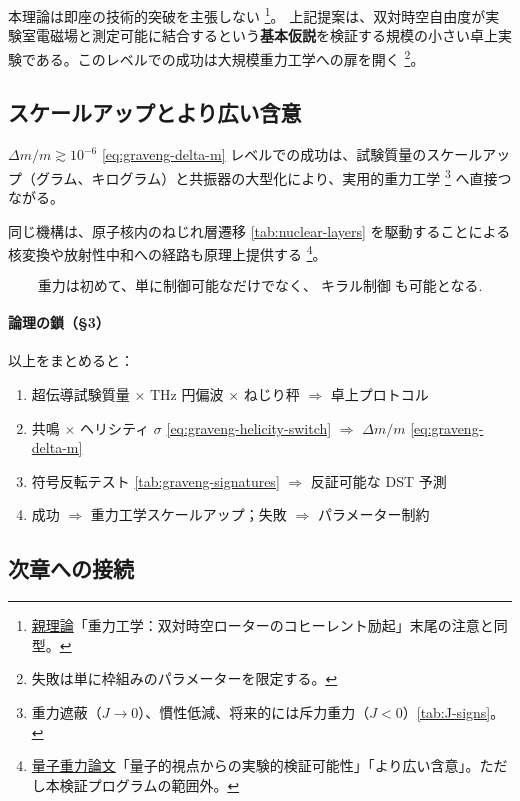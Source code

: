 \documentclass[dvipdfmx,a4paper,oneside]{jsbook}
\numberwithin{equation}{chapter}
\begin{document}
本理論は即座の技術的突破を主張しない \footnote{\hyperref[sec:sister-manuscripts]{親理論}「重力工学：双対時空ローターのコヒーレント励起」末尾の注意と同型。}。
上記提案は、双対時空自由度が実験室電磁場と測定可能に結合するという\textbf{基本仮説}を検証する規模の小さい卓上実験である。このレベルでの成功は大規模重力工学への扉を開く \footnote{失敗は単に枠組みのパラメーターを限定する。}。

\subsection{スケールアップとより広い含意}

\(\Delta m/m \gtrsim 10^{-6}\) \eqref{eq:graveng-delta-m} レベルでの成功は、試験質量のスケールアップ（グラム、キログラム）と共振器の大型化により、実用的重力工学 \footnote{重力遮蔽（\(J \to 0\)）、慣性低減、将来的には斥力重力（\(J < 0\)）\eqref{tab:J-signs}。} へ直接つながる。

同じ機構は、原子核内のねじれ層遷移 \eqref{tab:nuclear-layers} を駆動することによる核変換や放射性中和への経路も原理上提供する \footnote{\hyperref[sec:sister-manuscripts]{量子重力論文}「量子的視点からの実験的検証可能性」「より広い含意」。ただし本検証プログラムの範囲外。}。

\begin{equation}
  \boxed{\;
  \text{重力は初めて、単に制御可能なだけでなく、}
  \;\textbf{キラル制御}\;\text{も可能となる}.
  \;}
  \label{eq:graveng-chiral-control}
\end{equation}

\paragraph{論理の鎖（§3）}
以上をまとめると：
\begin{enumerate}[leftmargin=2em]
  \item 超伝導試験質量 × THz 円偏波 × ねじり秤 \(\Rightarrow\) 卓上プロトコル
  \item 共鳴 × ヘリシティ \(\sigma\) \eqref{eq:graveng-helicity-switch} \(\Rightarrow\) \(\Delta m/m\) \eqref{eq:graveng-delta-m}
  \item 符号反転テスト \eqref{tab:graveng-signatures} \(\Rightarrow\) 反証可能な DST 予測
  \item 成功 \(\Rightarrow\) 重力工学スケールアップ；失敗 \(\Rightarrow\) パラメーター制約
\end{enumerate}

\subsection{次章への接続}
\end{document}
